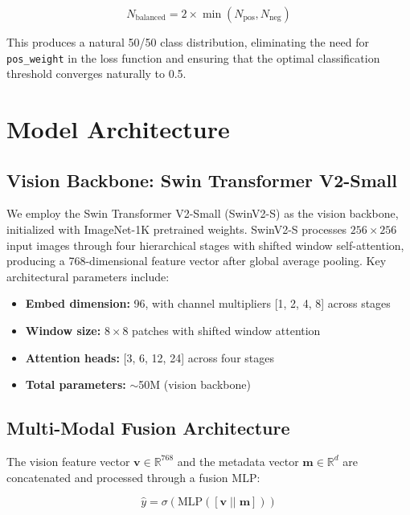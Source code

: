 \documentclass[12pt,a4paper]{report}
\begin{document}
\begin{equation}
    N_{\text{balanced}} = 2 \times \min(N_{\text{pos}}, N_{\text{neg}})
    \label{eq:balanced}
\end{equation}

This produces a natural 50/50 class distribution, eliminating the need for \texttt{pos\_weight} in the loss function and ensuring that the optimal classification threshold converges naturally to 0.5.

\section{Model Architecture}

\subsection{Vision Backbone: Swin Transformer V2-Small}

We employ the Swin Transformer V2-Small (SwinV2-S) \cite{liu2022swinv2} as the vision backbone, initialized with ImageNet-1K pretrained weights. SwinV2-S processes $256 \times 256$ input images through four hierarchical stages with shifted window self-attention, producing a 768-dimensional feature vector after global average pooling. Key architectural parameters include:

\begin{itemize}
    \item \textbf{Embed dimension:} 96, with channel multipliers [1, 2, 4, 8] across stages
    \item \textbf{Window size:} $8 \times 8$ patches with shifted window attention
    \item \textbf{Attention heads:} [3, 6, 12, 24] across four stages
    \item \textbf{Total parameters:} $\sim$50M (vision backbone)
\end{itemize}

\subsection{Multi-Modal Fusion Architecture}

The vision feature vector $\mathbf{v} \in \mathbb{R}^{768}$ and the metadata vector $\mathbf{m} \in \mathbb{R}^{d}$ are concatenated and processed through a fusion MLP:

\begin{equation}
    \hat{y} = \sigma\left( \text{MLP}\left( [\mathbf{v} \; || \; \mathbf{m}] \right) \right)
    \label{eq:fusion}
\end{equation}
\end{document}
